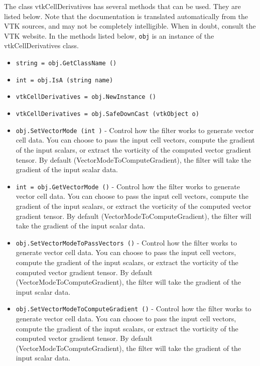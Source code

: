 The class vtkCellDerivatives has several methods that can be used.
  They are listed below.
Note that the documentation is translated automatically from the VTK sources,
and may not be completely intelligible.  When in doubt, consult the VTK website.
In the methods listed below, \verb|obj| is an instance of the vtkCellDerivatives class.
\begin{itemize}
\item  \verb|string = obj.GetClassName ()|

\item  \verb|int = obj.IsA (string name)|

\item  \verb|vtkCellDerivatives = obj.NewInstance ()|

\item  \verb|vtkCellDerivatives = obj.SafeDownCast (vtkObject o)|

\item  \verb|obj.SetVectorMode (int )| -  Control how the filter works to generate vector cell data. You
 can choose to pass the input cell vectors, compute the gradient
 of the input scalars, or extract the vorticity of the computed
 vector gradient tensor. By default (VectorModeToComputeGradient),
 the filter will take the gradient of the input scalar data.

\item  \verb|int = obj.GetVectorMode ()| -  Control how the filter works to generate vector cell data. You
 can choose to pass the input cell vectors, compute the gradient
 of the input scalars, or extract the vorticity of the computed
 vector gradient tensor. By default (VectorModeToComputeGradient),
 the filter will take the gradient of the input scalar data.

\item  \verb|obj.SetVectorModeToPassVectors ()| -  Control how the filter works to generate vector cell data. You
 can choose to pass the input cell vectors, compute the gradient
 of the input scalars, or extract the vorticity of the computed
 vector gradient tensor. By default (VectorModeToComputeGradient),
 the filter will take the gradient of the input scalar data.

\item  \verb|obj.SetVectorModeToComputeGradient ()| -  Control how the filter works to generate vector cell data. You
 can choose to pass the input cell vectors, compute the gradient
 of the input scalars, or extract the vorticity of the computed
 vector gradient tensor. By default (VectorModeToComputeGradient),
 the filter will take the gradient of the input scalar data.


\end{itemize}
